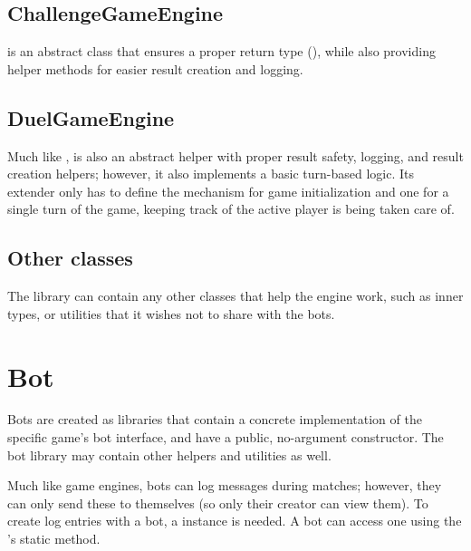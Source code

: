 		\subsection*{ChallengeGameEngine}
		
		 is an abstract class that ensures a proper return type (), while also providing helper methods for easier result creation and logging.
		
		\subsection*{DuelGameEngine}
		
		Much like ,  is also an abstract helper with proper result safety, logging, and result creation helpers; however, it also implements a basic turn-based logic. Its extender only has to define the mechanism for game initialization and one for a single turn of the game, keeping track of the active player is being taken care of.
		
		\subsection*{Other classes}
		
		The library can contain any other classes that help the engine work, such as inner types, or utilities that it wishes not to share with the bots.

	\section{Bot}
	
	Bots are created as libraries that contain a concrete implementation of the specific game's bot interface, and have a public, no-argument constructor. The bot library may contain other helpers and utilities as well.

	Much like game engines, bots can log messages during matches; however, they can only send these to themselves (so only their creator can view them). To create log entries with a bot, a  instance is needed. A bot can access one using the 's static  method.

%






